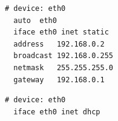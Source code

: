 \begin{lstlisting}[style=BashInputStyle,caption={Raspbian configuration for static ip address},label=lst:staticIP]
# device: eth0
  auto  eth0
  iface eth0 inet static
  address   192.168.0.2
  broadcast 192.168.0.255
  netmask   255.255.255.0
  gateway   192.168.0.1
\end{lstlisting}

\begin{lstlisting}[style=BashInputStyle,caption={Raspbian configuration for dynamic ip address},label=lst:dynamicIP]
# device: eth0
  iface eth0 inet dhcp
\end{lstlisting}


